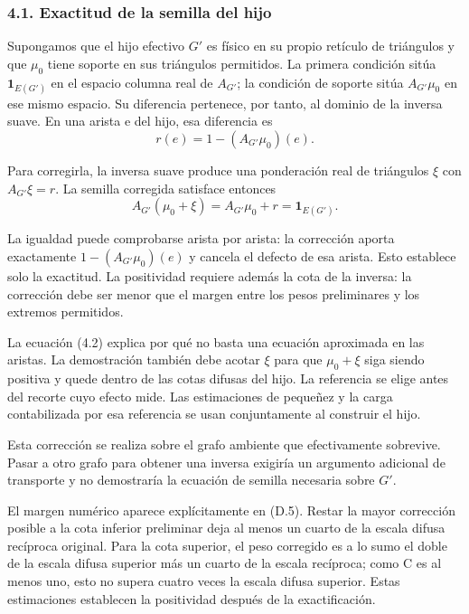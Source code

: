 \documentclass[spanish,11pt,a4paper]{article}
\begin{document}
\subsubsection{4.1. Exactitud de la semilla del hijo}\label{exactitud-de-la-semilla-del-hijo}

Supongamos que el hijo efectivo \(G'\) es físico en su propio retículo de triángulos y que \(\mu_0\) tiene soporte en sus triángulos permitidos. La primera condición sitúa \(\mathbf1_{E(G')}\) en el espacio columna real de \(A_{G'}\); la condición de soporte sitúa \(A_{G'}\mu_0\) en ese mismo espacio. Su diferencia pertenece, por tanto, al dominio de la inversa suave. En una arista e del hijo, esa diferencia es
\[r(e)=1-(A_{G'}\mu_0)(e).                                           \tag{4.1}\]

Para corregirla, la inversa suave produce una ponderación real de triángulos \(\xi\) con \(A_{G'}\xi=r\). La semilla corregida satisface entonces
\[A_{G'}(\mu_0+\xi)=A_{G'}\mu_0+r=\mathbf1_{E(G')}.                  \tag{4.2}\]

La igualdad puede comprobarse arista por arista: la corrección aporta exactamente \(1-(A_{G'}\mu_0)(e)\) y cancela el defecto de esa arista. Esto establece solo la exactitud. La positividad requiere además la cota de la inversa: la corrección debe ser menor que el margen entre los pesos preliminares y los extremos permitidos.

La ecuación (4.2) explica por qué no basta una ecuación aproximada en las aristas. La demostración también debe acotar \(\xi\) para que \(\mu_0+\xi\) siga siendo positiva y quede dentro de las cotas difusas del hijo. La referencia se elige antes del recorte cuyo efecto mide. Las estimaciones de pequeñez y la carga contabilizada por esa referencia se usan conjuntamente al construir el hijo.

Esta corrección se realiza sobre el grafo ambiente que efectivamente sobrevive. Pasar a otro grafo para obtener una inversa exigiría un argumento adicional de transporte y no demostraría la ecuación de semilla necesaria sobre \(G'\).

El margen numérico aparece explícitamente en (D.5). Restar la mayor corrección posible a la cota inferior preliminar deja al menos un cuarto de la escala difusa recíproca original. Para la cota superior, el peso corregido es a lo sumo el doble de la escala difusa superior más un cuarto de la escala recíproca; como C es al menos uno, esto no supera cuatro veces la escala difusa superior. Estas estimaciones establecen la positividad después de la exactificación.
\end{document}

